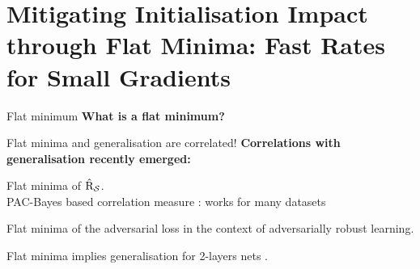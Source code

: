 \documentclass{presentation}
\begin{document}
\section{Mitigating Initialisation Impact through Flat Minima: Fast Rates for Small Gradients}
\begin{xframe}{Flat minimum}
    \textbf{What is a flat minimum?}
    \\
\end{xframe}


\begin{xframe}{Flat minima and generalisation are correlated!}
    \textbf{Correlations with generalisation recently emerged:}
    \vspace{0.5cm}
    \begin{xitemize}
        \item Flat minima of $\hat{\text{R}}_{\mathcal{S}}$.\\ PAC-Bayes based correlation measure : works for many datasets \citep{neyshabur2017explor,jiang2020fantastic,dziugaite2020search}
        \vspace{0.5cm}
        \item Flat minima of the adversarial loss in the context of adversarially robust learning. \citep{Stutz2021}
        \vspace{0.5cm}
        \item Flat minima implies generalisation for 2-layers nets \citep{wen2023sharpness}.
         
    \end{xitemize}
    \vspace{0.7cm}

    
\end{xframe}
\end{document}
